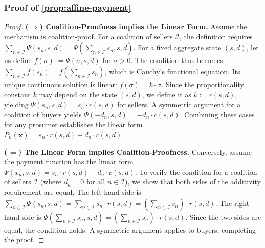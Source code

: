 \documentclass[12pt, notitlepage]{article}
\begin{document}
\subsubsection*{Proof of \cref{prop:affine-payment}}

\begin{proof}
\textbf{($\Rightarrow$) Coalition-Proofness implies the Linear Form.}
Assume the mechanism is coalition-proof. For a coalition of sellers $\mathcal{I}$, the definition requires $\sum_{n \in \mathcal{I}} \Psi(s_n, s, d) = \Psi(\sum_{n \in \mathcal{I}} s_n, s, d)$. For a fixed aggregate state $(s, d)$, let us define $f(\sigma) := \Psi(\sigma, s, d)$ for $\sigma>0$. The condition thus becomes $\sum_{n \in \mathcal{I}} f(s_n) = f(\sum_{n \in \mathcal{I}} s_n)$, which is Cauchy's functional equation. Its unique continuous solution is linear: $f(\sigma) = k \cdot \sigma$. Since the proportionality constant $k$ may depend on the state $(s,d)$, we define it as $k := r(s,d)$, yielding $\Psi(s_n, s, d) = s_n \cdot r(s,d)$ for sellers. A symmetric argument for a coalition of buyers yields $\Psi(-d_n, s, d) = -d_n \cdot c(s,d)$. Combining these cases for any prosumer establishes the linear form $P_n(\bm{x}) = s_n \cdot r(s,d) - d_n \cdot c(s,d)$.

\vspace{\baselineskip} %

\noindent\textbf{($\Leftarrow$) The Linear Form implies Coalition-Proofness.}
Conversely, assume the payment function has the linear form $\Psi(x_n, s, d) = s_n \cdot r(s,d) - d_n \cdot c(s,d)$. To verify the condition for a coalition of sellers $\mathcal{I}$ (where $d_n=0$ for all $n \in \mathcal{I}$), we show that both sides of the additivity requirement are equal. The left-hand side is $\sum_{n \in \mathcal{I}} \Psi(s_n, s, d) = \sum_{n \in \mathcal{I}} s_n \cdot r(s,d) = (\sum_{n \in \mathcal{I}} s_n) \cdot r(s,d)$. The right-hand side is $\Psi(\sum_{n \in \mathcal{I}} s_n, s, d) = (\sum_{n \in \mathcal{I}} s_n) \cdot r(s,d)$. Since the two sides are equal, the condition holds. A symmetric argument applies to buyers, completing the proof.
\end{proof}
\end{document}
